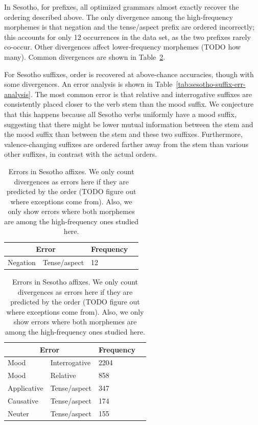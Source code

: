 In Sesotho, for prefixes, all optimized grammars almost exactly recover the ordering described above.
The only divergence among the high-frequency morphemes is that negation and the tense/aspect prefix are ordered incorrectly; this accounts for only 12 occurrences in the data set, as the two prefixes rarely co-occur.
Other divergences affect lower-frequency morphemes (TODO how many).
Common divergences are shown in Table~\ref{tab:sesotho-prefix-err-analysis}.

For Sesotho suffixes, order is recovered at above-chance accuracies, though with some divergences.
An error analysis is shown in Table~\ref{tab:sesotho-suffix-err-analysis}.
The most common error is that relative and interrogative suffixes are consistently placed closer to the verb stem than the mood suffix.
We conjecture that this happens because all Sesotho verbs uniformly have a mood suffix, suggesting that there might be lower mutual information between the stem and the mood suffix than between the stem and these two suffixes.
Furthermore, valence-changing suffixes are ordered farther away from the stem than various other suffixes, in contrast with the actual orders.

\begin{table}
    \centering
    \begin{tabular}{ll|ll}
    \multicolumn{2}{c|}{Error} & Frequency \\ \hline\hline
Negation & Tense/aspect & 12 \\
\end{tabular}

    \begin{tabular}{ll|ll}
    \multicolumn{2}{c|}{Error} & Frequency \\ \hline\hline
Mood & Interrogative & 2204 \\
Mood & Relative & 858 \\
Applicative & Tense/aspect & 347 \\
Causative & Tense/aspect & 174 \\
Neuter & Tense/aspect & 155 \\
\end{tabular}
    \caption{Errors in Sesotho affixes. We only count divergences as errors here if they are predicted by the order (TODO figure out where exceptions come from). Also, we only show errors where both morphemes are among the high-frequency ones studied here.}
    \label{tab:sesotho-prefix-err-analysis}
\end{table}




